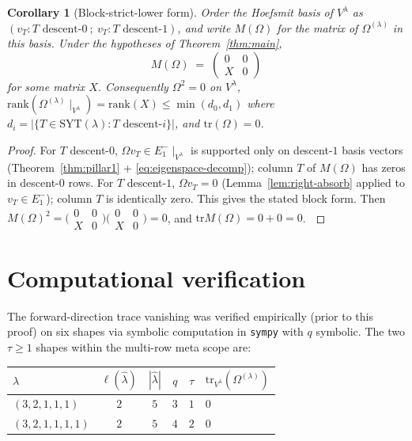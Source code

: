 \documentclass[11pt]{article}
\newtheorem{corollary}[theorem]{Corollary}
\theoremstyle{definition}
\newcommand{\Vlam}{V^{\lambda}}
\newcommand{\Om}{\Omega}
\newcommand{\hatl}{\widehat\lambda}
\newcommand{\elh}{\ell(\hatl)}
\newcommand{\SYT}{\mathrm{SYT}}
\newcommand{\tr}{\mathrm{tr}}
\begin{document}
\begin{corollary}[Block-strict-lower form]\label{cor:block}
Order the Hoefsmit basis of $\Vlam$ as
$(v_T : T \text{ descent-}0\ ;\ v_T : T \text{ descent-}1)$, and write
$M(\Om)$ for the matrix of $\Om^{(\lambda)}$ in this basis.  Under
the hypotheses of Theorem~\ref{thm:main},
\[
   M(\Om) \;=\; \begin{pmatrix} 0 & 0 \\ X & 0 \end{pmatrix}
\]
for some matrix $X$.  Consequently $\Om^2 = 0$ on $\Vlam$,
$\mathrm{rank}(\Om^{(\lambda)}\!\mid_{\Vlam}) = \mathrm{rank}(X) \le \min(d_0, d_1)$
where $d_i = |\{T \in \SYT(\lambda) : T \text{ descent-}i\}|$, and
$\tr(\Om) = 0$.
\end{corollary}

\begin{proof}
For $T$ descent-$0$, $\Om v_T \in E_1^-\!\mid_{\Vlam}$ is supported only
on descent-$1$ basis vectors (Theorem~\ref{thm:pillar1} +
\eqref{eq:eigenspace-decomp}); column $T$ of $M(\Om)$ has zeros in
descent-$0$ rows.  For $T$ descent-$1$, $\Om v_T = 0$
(Lemma~\ref{lem:right-absorb} applied to $v_T \in E_1^-$); column $T$
is identically zero.  This gives the stated block form.  Then
$M(\Om)^2 = \bigl(\begin{smallmatrix}0&0\\X&0\end{smallmatrix}\bigr)
\bigl(\begin{smallmatrix}0&0\\X&0\end{smallmatrix}\bigr) = 0$, and
$\tr M(\Om) = 0 + 0 = 0$. $\qedhere$
\end{proof}

\section{Computational verification}\label{sec:verification}

The forward-direction trace vanishing was verified empirically (prior
to this proof) on six shapes via symbolic computation in
\texttt{sympy} with $q$ symbolic.  The two $\tau \ge 1$ shapes within
the multi-row meta scope are:
\begin{center}
\begin{tabular}{lccccl}
\hline
$\lambda$ & $\elh$ & $|\hatl|$ & $q$ & $\tau$ & $\tr_{\Vlam}(\Om^{(\lambda)})$\\
\hline
$(3,2,1,1,1)$    & $2$ & $5$ & $3$ & $1$ & $0$\\
$(3,2,1,1,1,1)$  & $2$ & $5$ & $4$ & $2$ & $0$\\
\hline
\end{tabular}
\end{center}
\end{document}
